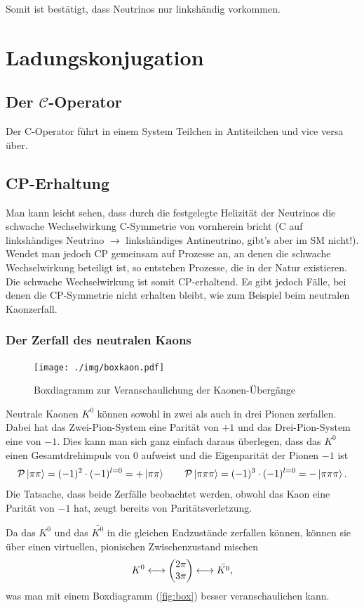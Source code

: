 Somit ist bestätigt, dass Neutrinos nur linkshändig vorkommen.

\section{Ladungskonjugation}
\subsection{Der $\mathcal{C}$-Operator}
Der C-Operator führt in einem System Teilchen in Antiteilchen und vice versa über.

\subsection{CP-Erhaltung}
Man kann leicht sehen, dass durch die festgelegte Helizität der Neutrinos die schwache Wechselwirkung C-Symmetrie von vornherein bricht (C auf linkshändiges Neutrino $\rightarrow$ linkshändiges Antineutrino, gibt's aber im SM nicht!).
Wendet man jedoch CP gemeinsam auf Prozesse an, an denen die schwache Wechselwirkung beteiligt ist, so entstehen Prozesse, die in der Natur existieren.
Die schwache Wechselwirkung ist somit CP-erhaltend.
Es gibt jedoch Fälle, bei denen die CP-Symmetrie nicht erhalten bleibt, wie zum Beispiel beim neutralen Kaonzerfall.

\subsubsection{Der Zerfall des neutralen Kaons}
\begin{figure}
	\centering
	\texttt{[image: ./img/boxkaon.pdf]}
	\caption{Boxdiagramm zur Veranschaulichung der Kaonen-Übergänge}
	\label{fig:box}
\end{figure}
Neutrale Kaonen $K^0$ können sowohl in zwei als auch in drei Pionen zerfallen.
Dabei hat das Zwei-Pion-System eine Parität von $+1$ und das Drei-Pion-System eine von $-1$.
Dies kann man sich ganz einfach daraus überlegen, dass das $K^0$ einen Gesamtdrehimpuls von 0 aufweist und die Eigenparität der Pionen $-1$ ist
\begin{equation*}
	\mathcal{P}\ket{\pi\pi} = (-1)^2\cdot (-1)^{l=0} = +\ket{\pi\pi}\qquad \mathcal{P}\ket{\pi\pi\pi} = (-1)^3\cdot (-1)^{l=0} = -\ket{\pi\pi\pi}.
\end{equation*}
Die Tatsache, dass beide Zerfälle beobachtet werden, obwohl das Kaon eine Parität von $-1$ hat, zeugt bereits von Paritätsverletzung.

Da das $K^0$ und das $\bar{K^0}$ in die gleichen Endzustände zerfallen können, können sie über einen virtuellen, pionischen Zwischenzustand mischen
\begin{equation*}
	K^0 \longleftrightarrow \begin{pmatrix} 2\pi \\ 3\pi \end{pmatrix} \longleftrightarrow \bar{K^0},
\end{equation*}
was man mit einem Boxdiagramm (\autoref{fig:box}) besser veranschaulichen kann.


